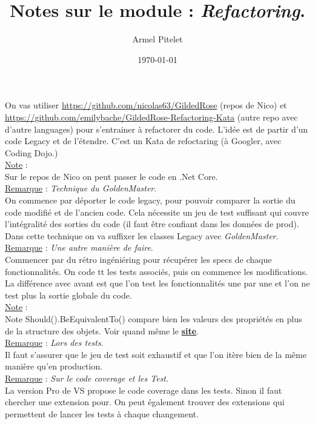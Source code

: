 \documentclass[a4paper,12pt,twoside]{article}
\title{Notes sur le module : \textit{Refactoring}.}
\author{Armel Pitelet}
\date{\today}
\newcommand{\urlcolor}{magenta}  %
\newcommand{\keycolor}{purple} %
\newcommand{\rem}[2]{\noindent\underline{Remarque} : \textit{#1}.\\ \indent #2}
\newcommand{\note}[1]{\noindent\underline{Note} : \\ \indent #1}
\newcommand{\keyref}[2]{\hypersetup{urlcolor=\keycolor} \href{#1}{\textbf{#2}}\hypersetup{urlcolor=\urlcolor}}
\begin{document}
\maketitle
\tableofcontents

On vas utiliser \url{https://github.com/nicolas63/GildedRose} (repos de Nico) et \url{https://github.com/emilybache/GildedRose-Refactoring-Kata} (autre repo avec d'autre languages) pour s'entrainer à refactorer du code. L'idée est de partir d'un code Legacy et de l'étendre. C'est un Kata de refoctaring (à Googler, avec Coding Dojo.)\\

\note{Sur le repos de Nico on peut passer le code en .Net Core.}\\

\rem{Technique du GoldenMaster}{On commence par déporter le code legacy, pour pouvoir comparer la sortie du code modifié et de l'ancien code. Cela nécessite un jeu de test suffisant qui couvre l'intégralité des sorties du code (il faut être confiant dans les données de prod). Dans cette technique on va suffixer les classes Legacy avec \textit{GoldenMaster}.}\\

\rem{Une autre manière de faire}{Commencer par du rétro ingéniéring pour récupérer les specs de chaque fonctionnalités. On code tt les tests associés, puis on commence les modifications. La différence avec avant est que l'on test les fonctionnalités une par une et l'on ne test plus la sortie globale du code.}\\

\note{Note Should().BeEquivalentTo() compare bien les valeurs des propriétés en plus de la structure des objets. Voir quand même le \keyref{https://fluentassertions.com/objectgraphs/}{site}.}\\

\rem{Lors des tests}{Il faut s'assurer que le jeu de test soit exhaustif et que l'on itère bien de la même manière qu'en production.}\\

\rem{Sur le code coverage et les Test}{La version Pro de VS propose le code coverage dans les tests. Sinon il faut chercher une extension pour. On peut également trouver des extensions qui permettent de lancer les tests à chaque changement.}\\
\end{document}
